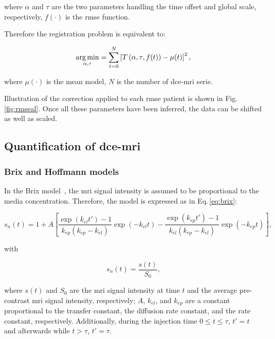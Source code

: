 \noindent where $\alpha$ and $\tau$ are the two parameters handling the time offset and global scale, respectively, $f(\cdot)$ is the \ac{rmse} function.

Therefore the registration problem is equivalent to:

\begin{equation}
  \operatorname*{arg\,min}_{\alpha, \tau} = \sum_{t=0}^{N} \left[ T\left(\alpha, \tau, f(t)\right) - \mu(t) \right]^{2} ,
  \label{eq:cost}
\end{equation}

\noindent where $\mu(\cdot)$ is the mean model, $N$ is the number of \ac{dce}-\ac{mri} serie.

Illustration of the correction applied to each \ac{rmse} patient is shown in Fig.\,\ref{fig:rmseal}.
Once all these parameters have been inferred, the data can be shifted as well as scaled.

\subsection{Quantification of \ac{dce}-\ac{mri}}\label{sec:stateart}

\subsubsection{Brix and Hoffmann models}\label{sec:brixhoffmann}

In the Brix model~\citep{brix1991pharmacokinetic}, the \ac{mri} signal intensity is assumed to be proportional to the media concentration.
Therefore, the model is expressed as in Eq.\,\eqref{eq:brix}:

\begin{equation}
  s_n(t) = 1 + A \left[ \frac{\exp(k_{el} t') - 1}{k_{ep}(k_{ep} - k_{el})} \exp(- k_{el} t) - \frac{\exp(k_{ep} t') - 1}{k_{el}(k_{ep} - k_{el})} \exp(- k_{ep} t) \right],
  \label{eq:brix}
\end{equation}

\noindent with

\begin{equation}
  s_n(t) = \frac{s(t)}{S_0},
  \label{eq:enh}
\end{equation}

\noindent where $s(t)$ and $S_0$ are the \ac{mri} signal intensity at time $t$ and the average pre-contrast \ac{mri} signal intensity, respectively; $A$, $k_{el}$, and $k_{ep}$ are a constant proportional to the transfer constant, the diffusion rate constant, and the rate constant, respectively. Additionally, during the injection time $0 \leq t \leq \tau$, $t' = t$ and afterwards while $t > \tau$, $t' = \tau$.

